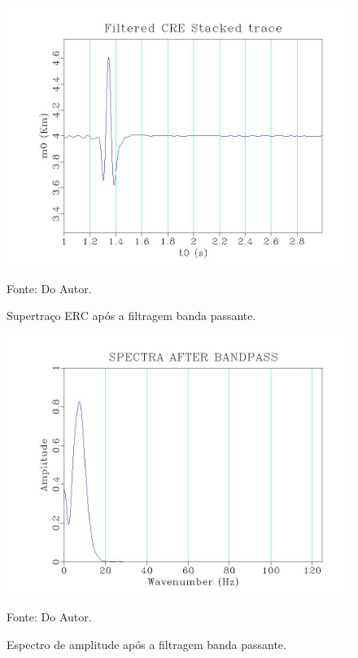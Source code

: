 \begin{figure}
\caption{Supertraço ERC após a filtragem banda passante.}
\begin{center}
\includegraphics[scale=0.4]{images/creStackedSectionFiltered.jpeg}
\vspace{-0.3cm}
\end{center}
\begin{center}
 Fonte: Do Autor.
\end{center}
\label{fig:7.4}
\end{figure}

\begin{figure}
\caption{Espectro de amplitude após a filtragem banda passante.}
\begin{center}
\includegraphics[scale=0.4]{images/filteredSpectra.jpeg}
\vspace{-0.3cm}
\end{center}
\begin{center}
 Fonte: Do Autor.
\end{center}
\label{fig:7.5}
\end{figure}

